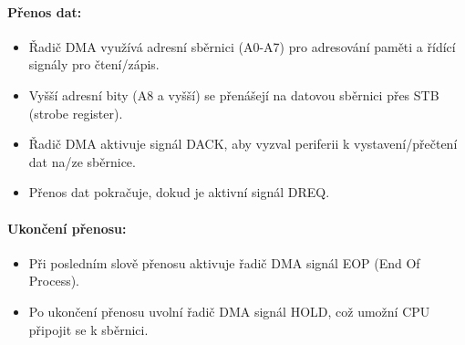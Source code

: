 \paragraph{Přenos dat:}
\begin{itemize}
  \item Řadič DMA využívá adresní sběrnici (A0-A7) pro adresování paměti a řídící signály pro čtení/zápis.
  \item Vyšší adresní bity (A8 a vyšší) se přenášejí na datovou sběrnici přes STB (strobe register).
  \item Řadič DMA aktivuje signál DACK, aby vyzval periferii k vystavení/přečtení dat na/ze sběrnice.
  \item Přenos dat pokračuje, dokud je aktivní signál DREQ.
\end{itemize}

\paragraph{Ukončení přenosu:}
\begin{itemize}
  \item Při posledním slově přenosu aktivuje řadič DMA signál EOP (End Of Process).
  \item Po ukončení přenosu uvolní řadič DMA signál HOLD, což umožní CPU připojit se k sběrnici.
\end{itemize}






